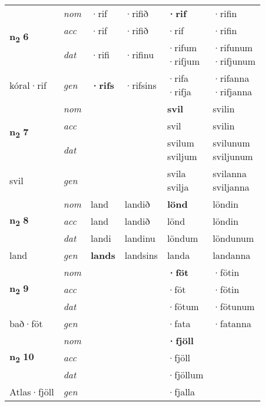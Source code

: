 \begin{longtable}[l]{X>{\footnotesize\itshape}XXXXX}
\multirow{3}{*}{{{\textbf{n{\textsubscript{2}}} \Large{\textbf{6}}}}} & nom & ·rif & ·rifið & \textbf{·rif} & ·rifin \\*
 & acc & ·rif & ·rifið & ·rif & ·rifin \\*
 & dat & ·rifi & ·rifinu & \specialcell{·rifum\\  ·rifjum} & \specialcell{·rifunum\\  ·rifjunum} \\*
 {\footnotesize{kóral\allowbreak ·rif}} & gen & \textbf{·rifs} & ·rifsins & \specialcell{·rifa\\  ·rifja} & \specialcell{·rifanna\\  ·rifjanna} \\
\midrule

\multirow{3}{*}{{{\textbf{n{\textsubscript{2}}} \Large{\textbf{7}}}}} & nom &  &  & \textbf{svil} & svilin \\*
 & acc &  &  & svil & svilin \\*
 & dat &  &  & \specialcell{svilum\\ sviljum} & \specialcell{svilunum\\ sviljunum} \\*
 {\footnotesize{svil}} & gen & \textbf{} &  & \specialcell{svila\\ svilja} & \specialcell{svilanna\\ sviljanna} \\
\midrule

\multirow{3}{*}{{{\textbf{n{\textsubscript{2}}} \Large{\textbf{8}}}}} & nom & land & landið & \textbf{lönd} & löndin \\*
 & acc & land & landið & lönd & löndin \\*
 & dat & landi & landinu & löndum & löndunum \\*
 {\footnotesize{land}} & gen & \textbf{lands} & landsins & landa & landanna \\
\midrule

\multirow{3}{*}{{{\textbf{n{\textsubscript{2}}} \Large{\textbf{9}}}}} & nom &  &  & \textbf{·föt} & ·fötin \\*
 & acc &  &  & ·föt & ·fötin \\*
 & dat &  &  & ·fötum & ·fötunum \\*
 {\footnotesize{bað\allowbreak ·föt}} & gen & \textbf{} &  & ·fata & ·fatanna \\
\midrule

\multirow{3}{*}{{{\textbf{n{\textsubscript{2}}} \Large{\textbf{10}}}}} & nom &  &  & \textbf{·fjöll} &  \\*
 & acc &  &  & ·fjöll &  \\*
 & dat &  &  & ·fjöllum &  \\*
 {\footnotesize{Atlas\allowbreak ·fjöll}} & gen & \textbf{} &  & ·fjalla &  \\
\midrule


\end{longtable}
